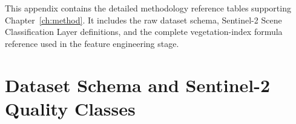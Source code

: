 
This appendix contains the detailed methodology reference tables supporting
Chapter~\ref{ch:method}. It includes the raw dataset schema, Sentinel-2
Scene Classification Layer definitions, and the complete vegetation-index
formula reference used in the feature engineering stage.


\section{Dataset Schema and Sentinel-2 Quality Classes}

\small
\setlength{\LTpre}{6pt}
\setlength{\LTpost}{6pt}
